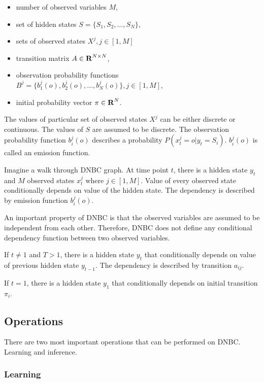\documentclass[thesis=B,english]{FITthesis}[2012/06/26]
\begin{document}
\begin{itemize}

\item{number of observed variables $M$,}
\item set of hidden states $S = \{S_1, S_2, \dots, S_N\}$,
\item{sets of observed states $X^j, j \in [1,M]$}
\item transition matrix $A \in \textbf R^{N \times N}$,
\item observation probability functions $B^j = \{b_1^j(o), b_2^j(o), \dots, b_N^j(o)\}, j \in [1,M]$,
\item initial probability vector $\pi \in \textbf R^N$.

\end{itemize}

The values of particular set of observed states $X^j$ can be either discrete or continuous. The values of $S$ are assumed to be discrete. The observation probability function $b_i^j(o)$ describes a probability $P(x^j_t=o|y_t=S_i)$. $b_i^j(o)$ is called an emission function.

Imagine a walk through DNBC graph. At time point $t$, there is a hidden state $y_t$ and $M$ observed states $x^j_t$ where $j \in [1,M]$. Value of every observed state conditionally depends on value of the hidden state. The dependency is described by emission function $b_i^j(o)$.

An important property of DNBC is that the observed variables are assumed to be independent from each other. Therefore, DNBC does not define any conditional dependency function between two observed variables.

If $t \neq 1$ and $T > 1$, there is a hidden state $y_t$ that conditionally depends on value of previous hidden state $y_{t-1}$. The dependency is described by transition $a_{ij}$.

If $t = 1$, there is a hidden state $y_1$ that conditionally depends on initial transition $\pi_i$.

\subsection{Operations}

There are two most important operations that can be performed on DNBC. Learning and inference.

\subsubsection{Learning}
\end{document}
